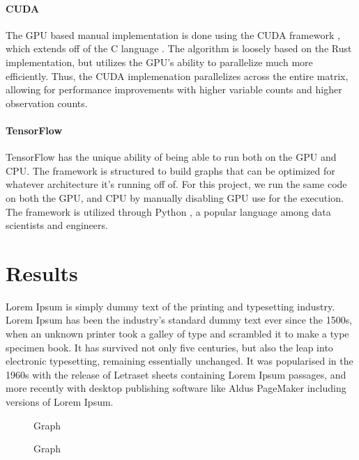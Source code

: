 \documentclass[12pt]{article}
\newcommand{\CC}{C\nolinebreak\hspace{-.05em}\raisebox{.4ex}{\tiny\bf +}\nolinebreak\hspace{-.10em}\raisebox{.4ex}{\tiny\bf +} }
\begin{document}
\paragraph{CUDA}
The GPU based manual implementation is done using the CUDA framework \cite{lib_cuda}, which extends off of the \CC language \cite{lang_c++}.
The algorithm is loosely based on the Rust implementation, but utilizes the GPU's ability to parallelize much more efficiently.
Thus, the CUDA implemenation parallelizes across the entire matrix, allowing for performance improvements with higher variable counts and higher observation counts.

\paragraph{TensorFlow}
TensorFlow \cite{lib_tensorflow} has the unique ability of being able to run both on the GPU and CPU.
The framework is structured to build graphs that can be optimized for whatever architecture it's running off of.
For this project, we run the same code on both the GPU, and CPU by manually disabling GPU use for the execution.
The framework is utilized through Python \cite{lang_python}, a popular language among data scientists and engineers.

\section{Results}

Lorem Ipsum is simply dummy text of the printing and typesetting industry. Lorem Ipsum has been the industry's standard dummy text ever since the 1500s, when an unknown printer took a galley of type and scrambled it to make a type specimen book. It has survived not only five centuries, but also the leap into electronic typesetting, remaining essentially unchanged. It was popularised in the 1960s with the release of Letraset sheets containing Lorem Ipsum passages, and more recently with desktop publishing software like Aldus PageMaker including versions of Lorem Ipsum.

\begin{figure}[h]
    
    \caption{Graph}
    \label{fig:graph_variables}
\end{figure}


\begin{figure}[h]
    
    \caption{Graph}
    \label{fig:graph_bootstraps}
\end{figure}
\end{document}
